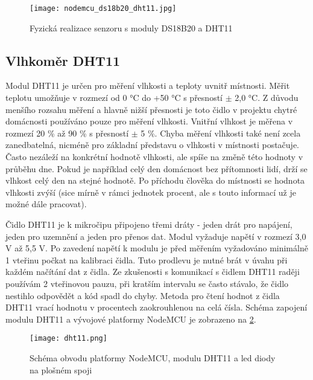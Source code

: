 \begin{figure}[H]
  \centering
  \texttt{[image: nodemcu\_ds18b20\_dht11.jpg]}
  \caption{Fyzická realizace senzoru s moduly DS18B20 a DHT11}
  \label{fig:nodemcu_ds18b20_dht11}
\end{figure} 

\subsection{Vlhkoměr DHT11} \label{subsec:dht11}

Modul DHT11 je určen pro měření vlhkosti a teploty uvnitř místnosti. Měřit teplotu umožňuje v rozmezí od 0 \si{\degree}C do +50 \si{\degree}C s přesností $\pm$ 2,0 \si{\degree}C. Z důvodu menšího rozsahu měření a hlavně nižší přesnosti je toto čidlo v projektu chytré domácnosti používáno pouze pro měření vlhkosti. Vnitřní vlhkost je měřena v rozmezí 20 \% až 90 \% s přesností $\pm$ 5 \%. Chyba měření vlhkosti také není zcela zanedbatelná, nicméně pro základní představu o vlhkosti v místnosti postačuje. Často nezáleží na konkrétní hodnotě vlhkosti, ale spíše na změně této hodnoty v průběhu dne. Pokud je například celý den domácnost bez přítomnosti lidí, drží se vlhkost celý den na stejné hodnotě. Po příchodu člověka do místnosti se hodnota vlhkosti zvýší (sice mírně v rámci jednotek procent, ale s touto informací už je možné dále pracovat). \par
Čidlo DHT11 je k mikročipu připojeno třemi dráty - jeden drát pro napájení, jeden pro uzemnění a jeden pro přenos dat. Modul vyžaduje napětí v rozmezí 3,0 V až 5,5 V. Po zavedení napětí k modulu je před měřením vyžadováno minimálně 1 vteřinu počkat na kalibraci čidla. Tuto prodlevu je nutné brát v úvahu při každém načítání dat z čidla. Ze zkušenosti s komunikací s čidlem DHT11 raději používám 2 vteřinovou pauzu, při kratším intervalu se často stávalo, že čidlo nestihlo odpovědět a kód spadl do chyby. Metoda pro čtení hodnot z čidla DHT11 vrací hodnotu v procentech zaokrouhlenou na celá čísla. Schéma zapojení modulu DHT11 a vývojové platformy NodeMCU je zobrazeno na \cref{fig:schema_esp_dht11}. \par

\begin{figure}[H]
  \centering
  \texttt{[image: dht11.png]}
  \caption{Schéma obvodu platformy NodeMCU, modulu DHT11 a led diody na plošném spoji}
  \label{fig:schema_esp_dht11}
\end{figure}

